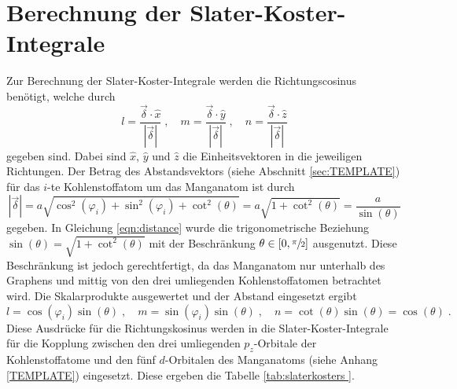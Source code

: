 \section{Berechnung der Slater-Koster-Integrale}
\label{sec:slaterkostercalc}
Zur Berechnung der Slater-Koster-Integrale werden die Richtungscosinus benötigt, welche durch
\begin{equation*}
    l = \frac{\vec{\delta} \cdot \hat{x}}{\left | \vec{\delta} \right |} \; , \quad
    m = \frac{\vec{\delta} \cdot \hat{y}}{\left | \vec{\delta} \right |} \; , \quad
    n = \frac{\vec{\delta} \cdot \hat{z}}{\left | \vec{\delta} \right |}
\end{equation*}
gegeben sind.
Dabei sind $\hat{x}$, $\hat{y}$ und $\hat{z}$ die Einheitsvektoren in die jeweiligen Richtungen. 
Der Betrag des Abstandsvektors (siehe Abschnitt \ref{sec:TEMPLATE}) für das $i$-te Kohlenstoffatom um das Manganatom ist durch 
\begin{equation*}
    \left | \vec{\delta} \right | = a \sqrt{\cos^2(\varphi_i) + \sin^2(\varphi_i) + \cot^2(\theta)} = a \sqrt{1+\cot^2(\theta)} = \frac{a}{\sin(\theta)} \label{eqn:distance}
\end{equation*}
gegeben.
In Gleichung \eqref{eqn:distance} wurde die trigonometrische Beziehung $\sin(\theta) = \sqrt{1+\cot^2(\theta)}$ \cite{trig} mit der Beschränkung
$\theta \in [ 0, \sfrac{\pi}{2} ] $ ausgenutzt. 
Diese Beschränkung ist jedoch gerechtfertigt, da das Manganatom nur unterhalb des Graphens und mittig von den drei umliegenden Kohlenstoffatomen betrachtet wird.
Die Skalarprodukte ausgewertet und der Abstand eingesetzt ergibt
\begin{equation*}
    l = \cos(\varphi_i) \sin(\theta) \; , \quad
    m = \sin(\varphi_i) \sin(\theta) \; , \quad
    n = \cot(\theta) \sin(\theta) = \cos(\theta) \; .
\end{equation*}
Diese Ausdrücke für die Richtungskosinus werden in die Slater-Koster-Integrale für die Kopplung zwischen den drei umliegenden 
$p_z$-Orbitale der Kohlenstoffatome und den fünf $d$-Orbitalen des Manganatoms (siehe Anhang \ref{TEMPLATE}) eingesetzt.
Diese ergeben die Tabelle \ref{tab:slaterkosters }.
